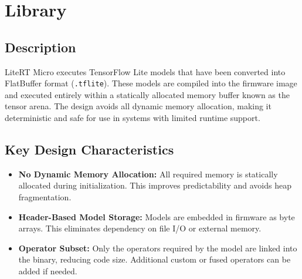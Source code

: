 %
%



%




%






\chapter{Library  }


\section{Description}



LiteRT Micro executes TensorFlow Lite models that have been converted into FlatBuffer format (\texttt{.tflite}). These models are compiled into the firmware image and executed entirely within a statically allocated memory buffer known as the tensor arena. The design avoids all dynamic memory allocation, making it deterministic and safe for use in systems with limited runtime support.



\section{Key Design Characteristics}



\begin{itemize}

	\item \textbf{No Dynamic Memory Allocation:} All required memory is statically allocated during initialization. This improves predictability and avoids heap fragmentation.

	

	\item \textbf{Header-Based Model Storage:} Models are embedded in firmware as byte arrays. This eliminates dependency on file I/O or external memory.

	

	\item \textbf{Operator Subset:} Only the operators required by the model are linked into the binary, reducing code size. Additional custom or fused operators can be added if needed.

\end{itemize}



